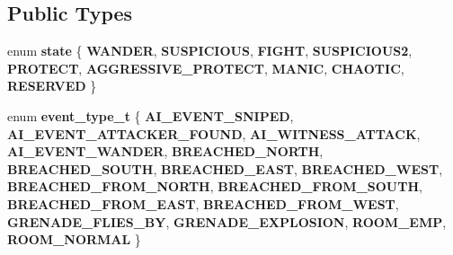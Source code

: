 \subsection*{Public Types}
\begin{DoxyCompactItemize}
\item 
\mbox{\label{classmods_1_1ai__state_a1daab0dbc867404effc56046b4c44e02}} 
enum {\bfseries state} \{ \newline
{\bfseries W\+A\+N\+D\+ER}, 
{\bfseries S\+U\+S\+P\+I\+C\+I\+O\+US}, 
{\bfseries F\+I\+G\+HT}, 
{\bfseries S\+U\+S\+P\+I\+C\+I\+O\+U\+S2}, 
\newline
{\bfseries P\+R\+O\+T\+E\+CT}, 
{\bfseries A\+G\+G\+R\+E\+S\+S\+I\+V\+E\+\_\+\+P\+R\+O\+T\+E\+CT}, 
{\bfseries M\+A\+N\+IC}, 
{\bfseries C\+H\+A\+O\+T\+IC}, 
\newline
{\bfseries R\+E\+S\+E\+R\+V\+ED}
 \}
\item 
\mbox{\label{classmods_1_1ai__state_a9d0f0e619232f82a8cb970718a04b3ae}} 
enum {\bfseries event\+\_\+type\+\_\+t} \{ \newline
{\bfseries A\+I\+\_\+\+E\+V\+E\+N\+T\+\_\+\+S\+N\+I\+P\+ED}, 
{\bfseries A\+I\+\_\+\+E\+V\+E\+N\+T\+\_\+\+A\+T\+T\+A\+C\+K\+E\+R\+\_\+\+F\+O\+U\+ND}, 
{\bfseries A\+I\+\_\+\+W\+I\+T\+N\+E\+S\+S\+\_\+\+A\+T\+T\+A\+CK}, 
{\bfseries A\+I\+\_\+\+E\+V\+E\+N\+T\+\_\+\+W\+A\+N\+D\+ER}, 
\newline
{\bfseries B\+R\+E\+A\+C\+H\+E\+D\+\_\+\+N\+O\+R\+TH}, 
{\bfseries B\+R\+E\+A\+C\+H\+E\+D\+\_\+\+S\+O\+U\+TH}, 
{\bfseries B\+R\+E\+A\+C\+H\+E\+D\+\_\+\+E\+A\+ST}, 
{\bfseries B\+R\+E\+A\+C\+H\+E\+D\+\_\+\+W\+E\+ST}, 
\newline
{\bfseries B\+R\+E\+A\+C\+H\+E\+D\+\_\+\+F\+R\+O\+M\+\_\+\+N\+O\+R\+TH}, 
{\bfseries B\+R\+E\+A\+C\+H\+E\+D\+\_\+\+F\+R\+O\+M\+\_\+\+S\+O\+U\+TH}, 
{\bfseries B\+R\+E\+A\+C\+H\+E\+D\+\_\+\+F\+R\+O\+M\+\_\+\+E\+A\+ST}, 
{\bfseries B\+R\+E\+A\+C\+H\+E\+D\+\_\+\+F\+R\+O\+M\+\_\+\+W\+E\+ST}, 
\newline
{\bfseries G\+R\+E\+N\+A\+D\+E\+\_\+\+F\+L\+I\+E\+S\+\_\+\+BY}, 
{\bfseries G\+R\+E\+N\+A\+D\+E\+\_\+\+E\+X\+P\+L\+O\+S\+I\+ON}, 
{\bfseries R\+O\+O\+M\+\_\+\+E\+MP}, 
{\bfseries R\+O\+O\+M\+\_\+\+N\+O\+R\+M\+AL}
 \}
\end{DoxyCompactItemize}
